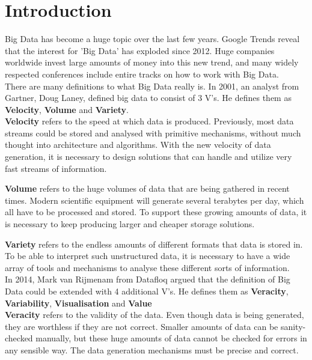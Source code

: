 \documentclass[a4paper]{article}
\begin{document}
\newpage
\tableofcontents

\newpage
{}
\section{Introduction}
Big Data has become a huge topic over the last few years. Google Trends reveal that the interest for 'Big Data' has exploded since 2012. Huge companies worldwide invest large amounts of money into this new trend\cite{bigdatainvest}, and many widely respected conferences include entire tracks on how to work with Big Data.\\

There are many definitions to what Big Data really is. In 2001, an analyst from Gartner, Doug Laney, defined big data to consist of 3 V's\cite{3vs}. He defines them as \textbf{Velocity}, \textbf{Volume} and \textbf{Variety}.\\

\textbf{Velocity} refers to the speed at which data is produced. Previously, most data streams could be stored and analysed with primitive mechanisms, without much thought into architecture and algorithms. With the new velocity of data generation, it is necessary to design solutions that can handle and utilize very fast streams of information.

\textbf{Volume} refers to the huge volumes of data that are being gathered in recent times. Modern scientific equipment will generate several terabytes per day, which all have to be processed and stored. To support these growing amounts of data, it is necessary to keep producing larger and cheaper storage solutions.

\textbf{Variety} refers to the endless amounts of different formats that data is stored in. To be able to interpret such unstructured data, it is necessary to have a wide array of tools and mechanisms to analyse these different sorts of information.\\

In 2014, Mark van Rijmenam from Datafloq\cite{7vs} argued that the definition of Big Data could be extended with 4 additional V's. He defines them as \textbf{Veracity}, \textbf{Variability}, \textbf{Visualisation} and \textbf{Value}\\

\textbf{Veracity} refers to the validity of the data. Even though data is being generated, they are worthless if they are not correct. Smaller amounts of data can be sanity-checked manually, but these huge amounts of data cannot be checked for errors in any sensible way. The data generation mechanisms must be precise and correct.
\end{document}
